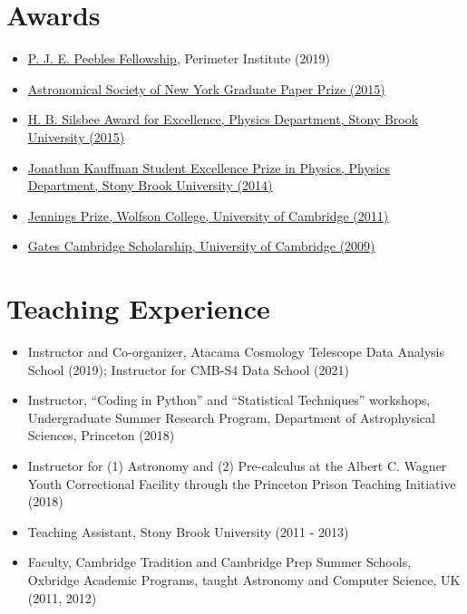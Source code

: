 \documentclass[11pt,margin]{res}
\begin{document}
\begin{resume}
\section{Awards}
\par
\begin{itemize}
\item \href{https://perimeterinstitute.ca/news/new-fellowships-aim-support-early-career-researchers}{P. J. E. Peebles Fellowship}, Perimeter Institute (2019)
\item \href{https://www.astrony.org/prizes}{Astronomical Society of New York Graduate Paper Prize (2015)}
\item \href{http://www.physics.sunysb.edu/Physics/awards/awards.shtml}{H. B. Silsbee Award for Excellence, Physics Department, Stony Brook University (2015)}
\item \href{http://www.physics.sunysb.edu/Physics/awards/awards.shtml}{Jonathan Kauffman Student Excellence Prize in Physics, Physics Department, Stony Brook University (2014)}
\item \href{https://www.wolfson.cam.ac.uk/current-students/support/financial/academic-prizes}{Jennings Prize, Wolfson College, University of Cambridge (2011)}
\item \href{https://www.gatescambridge.org/}{Gates Cambridge Scholarship, University of Cambridge (2009)}
\end{itemize}

\section{Teaching Experience}
\begin{itemize}
\item Instructor and Co-organizer, Atacama Cosmology Telescope Data Analysis School (2019); Instructor for CMB-S4 Data School (2021)
\item Instructor, ``Coding in Python'' and ``Statistical Techniques''
  workshops, Undergraduate Summer Research Program, Department of
  Astrophysical Sciences, Princeton (2018)
\item Instructor for (1) Astronomy and (2) Pre-calculus at the Albert C. Wagner
  Youth Correctional Facility through the Princeton Prison Teaching Initiative (2018)
\item Teaching Assistant, Stony Brook University (2011 - 2013)
\item Faculty, Cambridge Tradition and Cambridge Prep Summer Schools, Oxbridge Academic Programs, taught Astronomy and Computer Science, UK (2011, 2012)
\end{itemize}


\end{resume}
\end{document}
